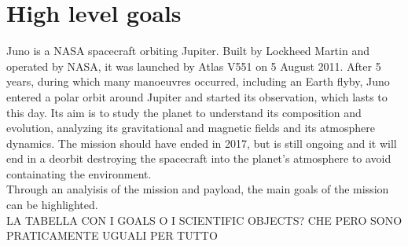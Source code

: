 \section{High level goals}
\label{sec:goals}
Juno is a NASA spacecraft orbiting Jupiter. Built by Lockheed Martin and operated by NASA, it was launched by Atlas V551 on 5 August 2011. After 5 years, during which many manoeuvres occurred, including an Earth flyby, Juno entered a polar orbit around Jupiter and started its observation, which lasts to this day. Its aim is to study the planet to understand its composition and evolution, analyzing its gravitational and magnetic fields and its atmosphere dynamics. The mission should have ended in 2017, but is still ongoing and it will end in a deorbit destroying the spacecraft into the planet's atmosphere to avoid containating the environment. 
\\   

Through an analyisis of the mission and payload, the main goals of the mission can be highlighted. \\


LA TABELLA CON I GOALS O I SCIENTIFIC OBJECTS? CHE PERO SONO PRATICAMENTE UGUALI PER TUTTO \\

